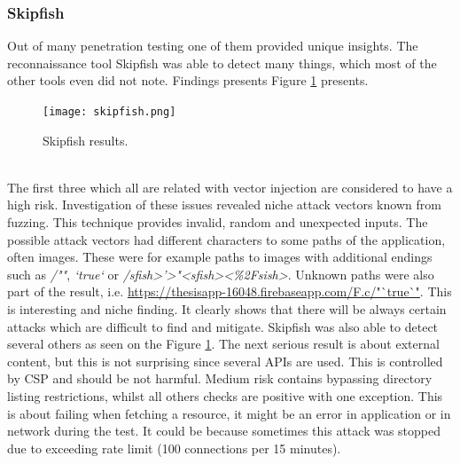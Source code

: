 \documentclass{article} %
\begin{document}
\subsubsection{Skipfish}
Out of many penetration testing one of them provided unique insights. The reconnaissance tool Skipfish was able to detect many things, which most of the other tools even did not note. Findings presents Figure \ref{fig:skipfish} presents.
\begin{figure}[ht]
  \centering
      \texttt{[image: skipfish.png]}
  \caption{Skipfish results.}
  \label{fig:skipfish}
\end{figure}\\
The first three which all are related with vector injection are considered to have a high risk.  Investigation of these issues revealed niche attack vectors known from fuzzing. This technique provides invalid, random and unexpected inputs. The possible attack vectors had different characters to some paths of the application, often images. These were for example paths to images with additional endings such as \textit{/""}, \textit{`true`} or \textit{/sfish>'>"<sfish><\%2Fsish>}. Unknown paths were also part of the result, i.e. \url{https://thesisapp-16048.firebaseapp.com/F.c/"`true`"}. This is interesting and niche finding. It clearly shows that there will be always certain attacks which are difficult to find and mitigate. Skipfish was also able to detect several others as seen on the Figure \ref{fig:skipfish}. The next serious result is about external content, but this is not surprising since several APIs are used. This is controlled by CSP and should be not harmful. Medium risk contains bypassing directory listing restrictions, whilst all others checks are positive with one exception. This is about failing when fetching a resource, it might be an error in application or in network during the test. It could be because sometimes this attack was stopped due to exceeding rate limit (100 connections per 15 minutes).
\end{document}
